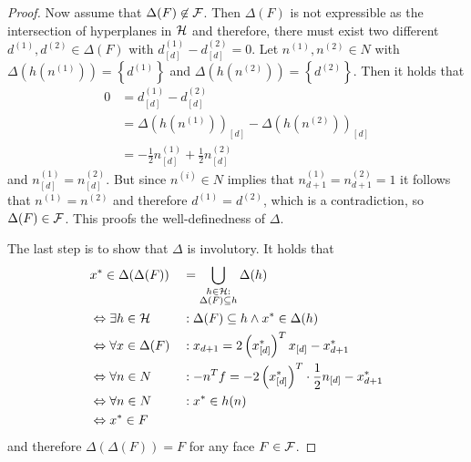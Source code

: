 \begin{proof}
    Now assume that $\Delta(F) \not\in \mathcal{F}$.
    Then $\Delta(F)$ is not expressible as the intersection of hyperplanes in $\mathcal{H}$ and therefore, there must exist two different $d^{(1)}, d^{(2)} \in \Delta(F)$ with $d_{[d]}^{(1)} - d_{[d]}^{(2)} = 0$.
    Let $n^{(1)}, n^{(2)} \in N$ with $\Delta(h(n^{(1)})) = \left\{ d^{(1)} \right\}$ and $\Delta(h(n^{(2)})) = \left\{ d^{(2)} \right\}$.
    Then it holds that
    \begin{align}
        0 &= d_{[d]}^{(1)} - d_{[d]}^{(2)}\\
        &= \Delta(h(n^{(1)}))_{[d]} - \Delta(h(n^{(2)}))_{[d]}\\
        &= -\frac{1}{2} n^{(1)}_{[d]} + \frac{1}{2} n^{(2)}_{[d]}
    \end{align}
    and $n^{(1)}_{[d]} = n^{(2)}_{[d]}$.
    But since $n^{(i)} \in N$ implies that $n^{(1)}_{d+1} = n^{(2)}_{d+1} = 1$ it follows that $n^{(1)} = n^{(2)}$ and therefore $d^{(1)} = d^{(2)}$, which is a contradiction, so $\Delta(F) \in \mathcal{F}$.
    This proofs the well-definedness of $\Delta$.

    The last step is to show that $\Delta$ is involutory.
    It holds that
    \begin{alignat}{2}
        &x^\ast \in \Delta(\Delta(F)) &&= \bigcup_{\substack{h \in \mathcal{H}:\\ \Delta(F) \subseteq h}} \Delta(h)\\
        &\Leftrightarrow \exists h \in \mathcal{H} &&{}: \Delta(F) \subseteq h \wedge x^\ast \in \Delta(h)\\
        &\Leftrightarrow \forall x \in \Delta(F) &&{}: x_{d+1} = 2 \left( x_{[d]}^\ast \right)^T x_{[d]} - x_{d+1}^\ast\\
        &\Leftrightarrow \forall n \in N &&{}: -n^Tf = -2 \left( x_{[d]}^\ast \right)^T \cdot \frac{1}{2}n_{[d]} - x_{d+1}^\ast\\
        &\Leftrightarrow \forall n \in N &&{}: x^\ast \in h(n)\\
        &\Leftrightarrow x^\ast \in F
    \end{alignat}
    and therefore $\Delta(\Delta(F)) = F$ for any face $F \in \mathcal{F}$.
\end{proof}

